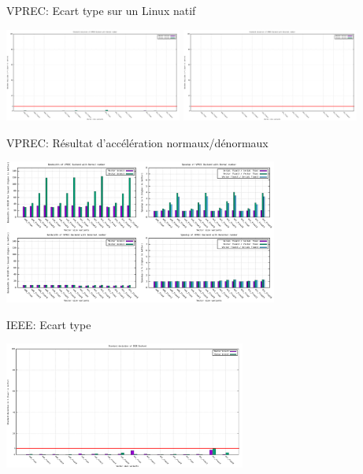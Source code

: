 \documentclass{beamer}
\begin{document}
\begin{frame}{VPREC: Ecart type sur un Linux natif}

  \centering\includegraphics[width=220px]{../ressources/laptop_vprec_normal_stddev.png}
  \centering\includegraphics[width=220px]{../ressources/laptop_vprec_denormal_stddev.png}
  
\end{frame}

\begin{frame}{VPREC: Résultat d'accélération normaux/dénormaux}

  \centering\includegraphics[width=340px]{../ressources/vm_vprec.png}
  
\end{frame}

\begin{frame}{IEEE: Ecart type}

  \centering\includegraphics[width=300px]{../ressources/vm_ieee_stddev.png}
  
\end{frame}
\end{document}
